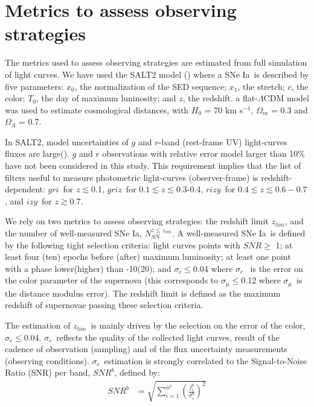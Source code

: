 \documentclass[skiphelvet,twocolumn]{lsstdescnote}
\newcommand{\snrb}{\mbox{$SNR^b$}}
\newcommand{\bg}{{$g$}}
\newcommand{\br}{{$r$}}
\newcommand{\bi}{{$i$}}
\newcommand{\bz}{{$z$}}
\newcommand{\by}{{$y$}}
\newcommand{\snstrech}{\mbox{$x_1$}}
\newcommand{\daymax}{$T_0$}
\newcommand{\sigc}{\mbox{$\sigma_c$}}
\newcommand{\sigmu}{\mbox{$\sigma_\mu$}}
\newcommand{\zlim}{\mbox{$z_{lim}$}}
\newcommand{\sne}{{SNe Ia}}
\newcommand{\nsn}{{$N_{SN}^{z\leq z_{lim}}$}}
\newcommand{\snx}{\mbox{$x_0$}}
\newcommand{\sncolor}{\mbox{$c$}}
\begin{document}
\section{Metrics to assess observing strategies}
\label{sec:metrics}
The metrics used to assess observing strategies are estimated from full simulation of light curves. We have used the SALT2 model (\citealt{Guy_2007,Guy_2010}) where a \sne~is described by five parameters: \snx, the normalization of the SED sequence; \snstrech, the stretch; \sncolor, the color; \daymax, the day of maximum luninosity; and $z$, the redshift. a flat-$\Lambda$CDM model was used to estimate cosmological distances, with $H_0$ = 70 km s$^{-1}$, $\Omega_m$ = 0.3 and $\Omega_\Lambda$ = 0.7.
\par
In SALT2, model uncertainties of $g$ and $r$-band (rest-frame UV) light-curves fluxes are large(\citealt{Guy_2007}). $g$ and $r$ observations with relative error model larger than 10$\%$ have not been considered in this study. This requirement implies that the list of filters useful to measure photometric light-curves (observer-frame) is redshift-dependent: \bg\br\bi~for $z\lesssim$0.1,  \bg\br\bi\bz~for $0.1\lesssim z\lesssim$0.3-0.4, \br\bi\bz\by~for $0.4\lesssim z \lesssim 0.6-0.7$, and \bi\bz\by~for $z\gtrsim 0.7$.
\par
We rely on two metrics to assess observing strategies: the redshift limit \zlim, and the number of well-measured \sne, \nsn. A well-measured \sne~is defined by the following tight selection criteria: light curves points with $SNR\geq$ 1; at least four (ten) epochs before (after) maximum luminosity; at least one point with a phase lower(higher) than -10(20); and \sigc$\leq$0.04 where \sigc~ is the error on the color parameter of the supernova (this corresponds to \sigmu$\leq$0.12 where \sigmu~is the distance modulus error). The redshift limit is defined as the maximum redshift of supernovae passing these selection criteria.
\par
The estimation of \zlim~is mainly driven by the selection on the error of the color, \sigc$\leq$0.04. \sigc~reflects the quality of the collected light curves, result of the cadence of observation (sampling) and of the flux uncertainty measurements (observing conditions). \sigc~estimation is strongly correlated to the Signal-to-Noise Ratio (SNR) per band, \snrb,  defined by:
\begin{equation}
  \begin{aligned}
    SNR^b &= \sqrt{\sum_{i=1}^{n^b}{\left(\frac{f_i^b}{\sigma_i^b}\right)^2}}
    \end{aligned}
  \label{eq:snrb}
\end{equation}
\end{document}

